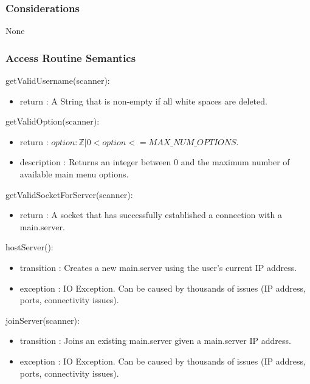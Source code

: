 \documentclass[12pt, titlepage]{article}
\begin{document}
    \subsubsection* {Considerations}
        None
    
    \subsubsection* {Access Routine Semantics}
    
        \noindent getValidUsername(scanner):
        \begin{itemize}
        \item return : A String that is non-empty if all white spaces are deleted.
        \end{itemize}
        
        \noindent getValidOption(scanner):
        \begin{itemize}
        \item return : $option : \mathbb{Z} | 0 < option <= MAX\_NUM\_OPTIONS$.
        \item description : Returns an integer between 0 and the maximum number of available main menu options.
        \end{itemize}
        
        \noindent getValidSocketForServer(scanner):
        \begin{itemize}
        \item return : A socket that has successfully established a connection with a main.server.
        \end{itemize}
        
        \noindent hostServer():
        \begin{itemize}
        \item transition : Creates a new main.server using the user's current IP address.
        \item exception : IO Exception. Can be caused by thousands of issues (IP address, ports, connectivity issues).
        \end{itemize}
        
        \noindent joinServer(scanner):
        \begin{itemize}
        \item transition : Joins an existing main.server given a main.server IP address.
        \item exception : IO Exception. Can be caused by thousands of issues (IP address, ports, connectivity issues).
        \end{itemize}
\end{document}
